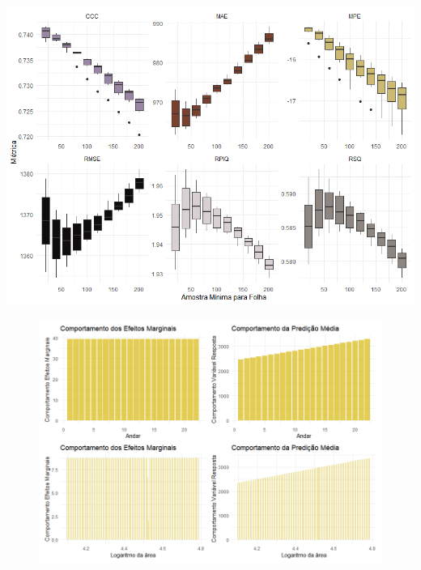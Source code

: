 \documentclass{beamer} %
\newcommand{\1}{\mathbb{I}}
\begin{document}
\begin{frame}

\includegraphics[scale = .45]{imagens/crossv_min.png}
    
\end{frame}


\begin{frame}

\begin{figure}[H]
    \label{ols_marg}
    \centering
    
    \includegraphics[scale = .45]{imagens/efeitos_marginais_lm.png}
\end{figure}

\end{frame}
\end{document}
